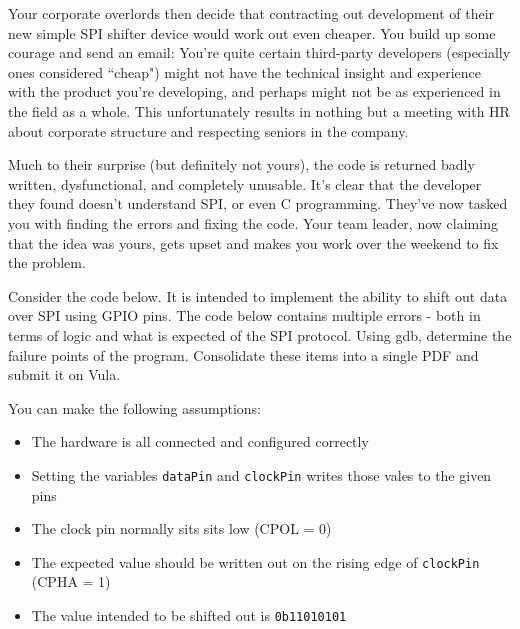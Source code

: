 Your corporate overlords then decide that contracting out development of their new simple SPI shifter device would work out even cheaper. You build up some courage and send an email: You're quite certain third-party developers (especially ones considered ``cheap") might not have the technical insight and experience with the product you're developing, and perhaps might not be as experienced in the field as a whole. This unfortunately results in nothing but a meeting with HR about corporate structure and respecting seniors in the company.

Much to their surprise (but definitely not yours), the code is returned badly written, dysfunctional, and completely unusable. It's clear that the developer they found doesn't understand SPI, or even C programming. They've now tasked you with finding the errors and fixing the code. Your team leader, now claiming that the idea was yours, gets upset and makes you work over the weekend to fix the problem.

Consider the code below. It is intended to implement the ability to shift out data over SPI using GPIO pins. The code below contains multiple errors - both in terms of logic and what is expected of the SPI protocol. Using gdb, determine the failure points of the program. Consolidate these items into a single PDF and submit it on Vula.

You can make the following assumptions:
\begin{itemize}
    \item The hardware is all connected and configured correctly
    \item Setting the variables \verb|dataPin| and \verb|clockPin| writes those vales to the given pins
    \item The clock pin normally sits sits low (CPOL = 0)
    \item The expected value should be written out on the rising edge of \verb|clockPin| (CPHA = 1)
    \item The value intended to be shifted out is \verb|0b11010101|
\end{itemize}


